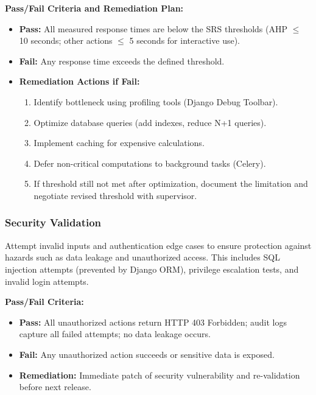 \documentclass[12pt, titlepage]{article}
\begin{document}
\textbf{Pass/Fail Criteria and Remediation Plan:}
\begin{itemize}
  \item \textbf{Pass:} All measured response times are below the SRS thresholds
  (AHP $\leq$ 10 seconds; other actions $\leq$ 5 seconds for interactive use).

  \item \textbf{Fail:} Any response time exceeds the defined threshold.

  \item \textbf{Remediation Actions if Fail:}
  \begin{enumerate}
    \item Identify bottleneck using profiling tools (Django Debug Toolbar).
    \item Optimize database queries (add indexes, reduce N+1 queries).
    \item Implement caching for expensive calculations.
    \item Defer non-critical computations to background tasks (Celery).
    \item If threshold still not met after optimization, document the limitation
    and negotiate revised threshold with supervisor.
  \end{enumerate}
\end{itemize}

\subsubsection{Security Validation}
Attempt invalid inputs and authentication edge cases to ensure protection
against hazards such as data leakage and unauthorized access. This includes
SQL injection attempts (prevented by Django ORM), privilege escalation tests,
and invalid login attempts.

\textbf{Pass/Fail Criteria:}
\begin{itemize}
  \item \textbf{Pass:} All unauthorized actions return HTTP 403 Forbidden;
  audit logs capture all failed attempts; no data leakage occurs.
  \item \textbf{Fail:} Any unauthorized action succeeds or sensitive data is exposed.
  \item \textbf{Remediation:} Immediate patch of security vulnerability and
  re-validation before next release.
\end{itemize}
\end{document}
